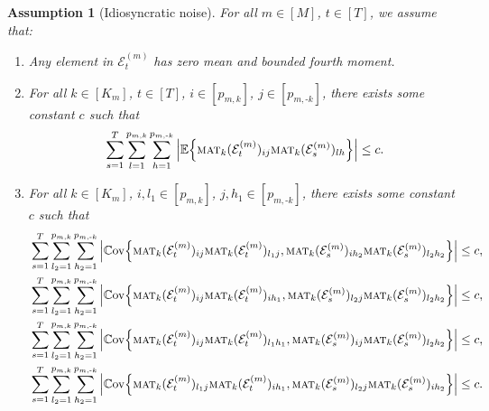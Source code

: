 \documentclass[aos]{imsart}
\theoremstyle{plain}
\newtheorem{assumption}{Assumption}
\theoremstyle{definition}
\def\mat{\textnormal{\textsc{mat}}}
\def\E{\mathbb{E}}
\def\cE{\mathcal{E}}
\def\cov{\mathbb{C}\mathrm{ov}}
\begin{document}
\begin{assumption}[Idiosyncratic noise]\label{ass: noise}
For all $m\in[M]$, $t\in[T]$, we assume that:
\begin{enumerate}[itemsep=0pt, label = (\alph*), left = 0pt]
    \item Any element in $\cE_t^{(m)}$ has zero mean and bounded fourth moment.
    \item For all $k\in[K_m]$, $t\in[T]$, $i\in[p_{m,k}]$, $j\in[p_{m,\text{-}k}]$, there exists some constant $c$ such that
    \[
    \sum_{s=1}^T \sum_{l=1}^{p_{m,k}} \sum_{h=1}^{p_{m,\text{-}k}} \Big| \E\Big\{ \mat_k(\cE_t^{(m)})_{ij} \mat_k(\cE_s^{(m)})_{lh} \Big\} \Big| \leq c .
    \]
    \item For all $k\in[K_m]$, $i,l_1\in[p_{m,k}]$, $j,h_1\in[p_{m,\text{-}k}]$, there exists some constant $c$ such that
    {\small
    \begin{align*}
        & \sum_{s=1}^T \sum_{l_2=1}^{p_{m,k}} \sum_{h_2=1}^{p_{m,\text{-}k}} \Big| \cov\Big\{ \mat_k(\cE_t^{(m)})_{ij} \mat_k(\cE_t^{(m)})_{l_1 j} , \mat_k(\cE_s^{(m)})_{ih_2} \mat_k(\cE_s^{(m)})_{l_2 h_2} \Big\} \Big| \leq c, \\
        & \sum_{s=1}^T \sum_{l_2=1}^{p_{m,k}} \sum_{h_2=1}^{p_{m,\text{-}k}} \Big| \cov\Big\{ \mat_k(\cE_t^{(m)})_{ij} \mat_k(\cE_t^{(m)})_{i h_1} , \mat_k(\cE_s^{(m)})_{l_2 j} \mat_k(\cE_s^{(m)})_{l_2 h_2} \Big\} \Big| \leq c, \\
        & \sum_{s=1}^T \sum_{l_2=1}^{p_{m,k}} \sum_{h_2=1}^{p_{m,\text{-}k}} \Big| \cov\Big\{ \mat_k(\cE_t^{(m)})_{ij} \mat_k(\cE_t^{(m)})_{l_1 h_1} , \mat_k(\cE_s^{(m)})_{ij} \mat_k(\cE_s^{(m)})_{l_2 h_2} \Big\} \Big| \leq c, \\
        & \sum_{s=1}^T \sum_{l_2=1}^{p_{m,k}} \sum_{h_2=1}^{p_{m,\text{-}k}} \Big| \cov\Big\{ \mat_k(\cE_t^{(m)})_{l_1 j} \mat_k(\cE_t^{(m)})_{i h_1} , \mat_k(\cE_s^{(m)})_{l_2 j} \mat_k(\cE_s^{(m)})_{i h_2} \Big\} \Big| \leq c .
    \end{align*}
    }
\end{enumerate}
\end{assumption}
\end{document}
